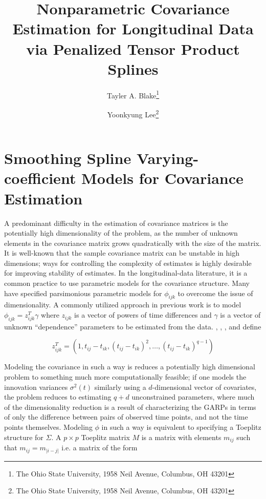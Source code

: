 \documentclass[12pt]{article}
\theoremstyle{definition}
\def\bL{\mathbf{L}}
\begin{document}
\def\bL{\mathbf{L}}



\title{ Nonparametric Covariance Estimation for Longitudinal Data via Penalized Tensor Product Splines}

\author{Tayler A. Blake\thanks{The Ohio State University, 1958 Neil Avenue, Columbus, OH 43201} \and  Yoonkyung Lee\thanks{The Ohio State University, 1958 Neil Avenue, Columbus, OH 43201}}


\maketitle

\section{Smoothing Spline Varying-coefficient Models for Covariance Estimation}

A predominant difficulty in the estimation of covariance matrices is the potentially high dimensionality of the problem, as the number of unknown elements in the covariance matrix grows quadratically with the size of the matrix. It is well-known that the sample covariance matrix can be unstable in high dimensions; ways for controlling the complexity of estimates is highly desirable for improving stability of estimates. In the longitudinal-data literature, it is a common practice to use parametric models for the covariance structure.  Many have specified parsimonious parametric models for $\phi_{ijk}$ to overcome the issue of dimensionality.   A commonly utilized approach in previous work is to model $\phi_{ijk} = z_{ijk}^T \gamma$ where $z_{ijk}$ is a vector of powers of time differences and $\gamma$ is a vector of unknown ``dependence'' parameters to be estimated from the data. \citet{chen2011efficient}, \citet{lin2009robust}, \citet{pan2003modelling},  and \citet{pourahmadi1999joint} define

\begin{equation}
z_{ijk}^T = \left(1, t_{ij} - t_{ik},\left( t_{ij} - t_{ik} \right)^2, \dots, \left(t_{ij} - t_{ik}\right)^{q-1} \right) \label{covmodel}
\end{equation}

Modeling the covariance in such a way is reduces a potentially high dimensional problem to something much more computationally feasible; if one models the innovation variances $\sigma^2\left(t\right)$ similarly using a $d$-dimensional vector of covariates, the problem reduces to estimating $q+d$ unconstrained parameters, where much of the dimensionality reduction is a result of characterizing the GARPs in terms of only the difference between pairs of observed time points, and not the time points themselves.  Modeling $\phi$ in such a way is equivalent to specifying a Toeplitz structure for $\Sigma$. A $p \times p$ Toeplitz matrix $M$ is a matrix with elements $m_{ij}$ such that $m_{ij} = m_{\vert i-j \vert}$ i.e. a matrix of the form
\end{document}
